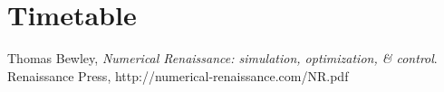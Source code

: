 \documentclass{article}
\begin{document}
\section{Timetable}

\newpage
\begin{thebibliography}{9}
  Thomas Bewley,
  \emph{Numerical Renaissance: simulation, optimization, \& control}.
  Renaissance Press,
  http://numerical-renaissance.com/NR.pdf

\end{thebibliography}
\end{document}
